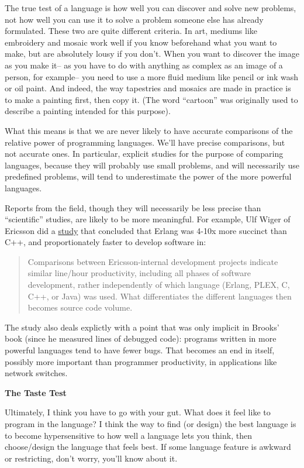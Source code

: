 The true test of a language is how well you can discover and solve new
problems, not how well you can use it to solve a problem someone else
has already formulated. These two are quite different criteria. In art,
mediums like embroidery and mosaic work well if you know beforehand what
you want to make, but are absolutely lousy if you don't. When you want
to discover the image as you make it-- as you have to do with anything
as complex as an image of a person, for example-- you need to use a more
fluid medium like pencil or ink wash or oil paint. And indeed, the way
tapestries and mosaics are made in practice is to make a painting first,
then copy it. (The word ``cartoon'' was originally used to describe a
painting intended for this purpose).

What this means is that we are never likely to have accurate comparisons
of the relative power of programming languages. We'll have precise
comparisons, but not accurate ones. In particular, explicit studies for
the purpose of comparing languages, because they will probably use small
problems, and will necessarily use predefined problems, will tend to
underestimate the power of the more powerful languages.

Reports from the field, though they will necessarily be less precise
than ``scientific'' studies, are likely to be more meaningful. For
example, Ulf Wiger of Ericsson did a
\href{http://www.erlang.se/publications/Ulf_Wiger.pdf}{study} that
concluded that Erlang was 4-10x more succinct than C++, and
proportionately faster to develop software in:

\begin{quote}
Comparisons between Ericsson-internal development projects indicate
similar line/hour productivity, including all phases of software
development, rather independently of which language (Erlang, PLEX, C,
C++, or Java) was used. What differentiates the different languages then
becomes source code volume.
\end{quote}

The study also deals explictly with a point that was only implicit in
Brooks' book (since he measured lines of debugged code): programs
written in more powerful languages tend to have fewer bugs. That becomes
an end in itself, possibly more important than programmer productivity,
in applications like network switches.

\textbf{The Taste Test}

Ultimately, I think you have to go with your gut. What does it feel like
to program in the language? I think the way to find (or design) the best
language is to become hypersensitive to how well a language lets you
think, then choose/design the language that feels best. If some language
feature is awkward or restricting, don't worry, you'll know about it.

